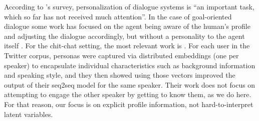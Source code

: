 According to 's survey, personalization of dialogue systems is ``an
important task, which so far has not received much attention''. In the case of goal-oriented dialogue some work has focused
on the agent being aware of the human's profile and adjusting the dialogue accordingly, but without a personality to the agent itself
 \citep{lucas2009managing,joshi2017personalization}.
For the chit-chat setting, the most relevant work is \citep{li2016persona}.
For each user in the Twitter corpus, personas were captured via distributed embeddings (one per speaker) to encapsulate individual characteristics such as background information and speaking style,
and they then showed using those vectors improved the output of their seq2seq model for the same speaker. 
Their work does not focus on attempting to engage the other speaker by getting to know them, as we do here. For that reason,
our focus is on explicit profile information, not hard-to-interpret latent variables. 




